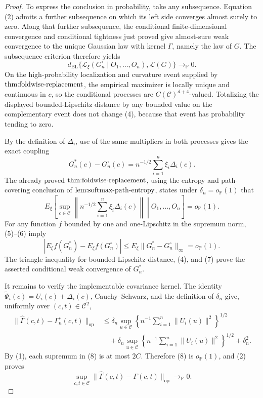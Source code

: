 \documentclass{article}
\begin{document}
\begin{proof}
To express the conclusion in probability, take any subsequence.  Equation (2) admits a further subsequence on which its left side converges almost surely to zero.  Along that further subsequence, the conditional finite-dimensional convergence and conditional tightness just proved give almost-sure weak convergence to the unique Gaussian law with kernel \(\Gamma\), namely the law of \(G\).  The subsequence criterion therefore yields
\[
 d_{\mathrm{BL}}\{\mathcal L_\xi(G_n^\circ\mid O_1,\ldots,O_n),\mathcal L(G)\}
 \longrightarrow_{\mathbb P}0. \tag{4}
\]
On the high-probability localization and curvature event supplied by \(\textnormal{thm:foldwise-replacement}\), the empirical maximizer is locally unique and continuous in \(c\), so the conditional processes are \(C(\mathcal C)^{d+4}\)-valued.  Totalizing the displayed bounded-Lipschitz distance by any bounded value on the complementary event does not change (4), because that event has probability tending to zero.

By the definition of \(\Delta_i\), use of the same multipliers in both processes gives the exact coupling
\[
 G_n^*(c)-G_n^\circ(c)
 =n^{-1/2}\sum_{i=1}^n\xi_i\Delta_i(c). \tag{5}
\]
The already proved \(\textnormal{thm:foldwise-replacement}\), using the entropy and path-covering conclusion of \(\textnormal{lem:softmax-path-entropy}\), states under \(\delta_n=o_{\mathbb P}(1)\) that
\[
 E_\xi\left[
 \sup_{c\in\mathcal C}\left\|n^{-1/2}\sum_{i=1}^n\xi_i\Delta_i(c)\right\|
 \middle|O_1,\ldots,O_n\right]=o_{\mathbb P}(1). \tag{6}
\]
For any function \(f\) bounded by one and one-Lipschitz in the supremum norm, (5)--(6) imply
\[
 \left|E_\xi f(G_n^*)-E_\xi f(G_n^\circ)\right|
 \le E_\xi\|G_n^*-G_n^\circ\|_\infty=o_{\mathbb P}(1). \tag{7}
\]
The triangle inequality for bounded-Lipschitz distance, (4), and (7) prove the asserted conditional weak convergence of \(G_n^*\).

It remains to verify the implementable covariance kernel.  The identity \(\widetilde\Psi_i(c)=U_i(c)+\Delta_i(c)\), Cauchy--Schwarz, and the definition of \(\delta_n\) give, uniformly over \((c,t)\in\mathcal C^2\),
\[
\begin{aligned}
 \|\widehat\Gamma(c,t)-\Gamma_n^\circ(c,t)\|_{\mathrm{op}}
 &\le \delta_n\sup_{u\in\mathcal C}
 \left\{n^{-1}\sum_{i=1}^n\|U_i(u)\|^2\right\}^{1/2}\\
 &\quad+\delta_n\sup_{u\in\mathcal C}
 \left\{n^{-1}\sum_{i=1}^n\|U_i(u)\|^2\right\}^{1/2}
 +\delta_n^2. 
\end{aligned} \tag{8}
\]
By (1), each supremum in (8) is at most \(2C\).  Therefore (8) is \(o_{\mathbb P}(1)\), and (2) proves
\[
 \sup_{c,t\in\mathcal C}
 \|\widehat\Gamma(c,t)-\Gamma(c,t)\|_{\mathrm{op}}
 \longrightarrow_{\mathbb P}0.
\]


\end{proof}
\end{document}
